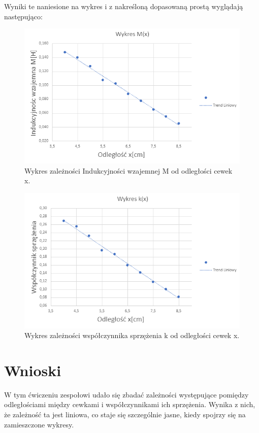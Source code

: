 \documentclass{article}
\begin{document}
\pagebreak

Wyniki te naniesione na wykres i z nakreśloną dopasowaną prostą
wyglądają następująco:

\begin{figure}[H]
    \centering
    \includegraphics[scale=0.8]{cw44/wykres_cw44.png}
    \caption{Wykres zależności Indukcyjności wzajemnej M od odległości cewek x.}
    \label{fig:wykres1}
\end{figure}
\begin{figure}[H]
    \centering
    \includegraphics[scale=0.8]{cw44/wykres2_cw44.png}
    \caption{Wykres zależności współczynnika sprzężenia k od odległości cewek x.}
    \label{fig:wykres1}
\end{figure}

\section{Wnioski}
W tym ćwiczeniu zespołowi udało się zbadać zależności występujące
pomiędzy odległościami między cewkami i współczynnikami ich 
sprzężenia. Wynika z nich, że zależność ta jest liniowa, co staje
się szczególnie jasne, kiedy spojrzy się na zamieszczone wykresy.
\end{document}
